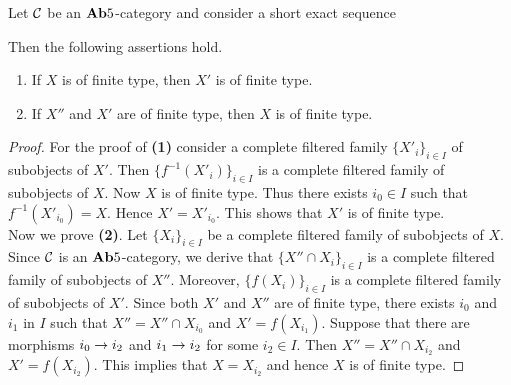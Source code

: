 \begin{proposition}\label{proposition:finitetypeandextensions}
Let ${\mathcal C}$ be an $\mathbf{Ab}5$-category and consider a short exact sequence
\begin{center}
\end{center}
Then the following assertions hold.
\begin{enumerate}[label=\emph{\textbf{(\arabic*)}}, leftmargin=1.5em]
\item If $X$ is of finite type, then $X'$ is of finite type.
\item If $X''$ and $X'$ are of finite type, then $X$ is of finite type.
\end{enumerate} 
\end{proposition}
\begin{proof}
For the proof of \textbf{(1)} consider a complete filtered family $\{X'_i\}_{i\in I}$ of subobjects of $X'$. Then $\{f^{-1}(X'_i)\}_{i\in I}$ is a complete filtered family of subobjects of $X$. Now $X$ is of finite type. Thus there exists $i_0\in I$ such that $f^{-1}(X'_{i_0})=X$. Hence $X' = X'_{i_0}$. This shows that $X'$ is of finite type.\\
Now we prove \textbf{(2)}. Let $\{X_i\}_{i\in I}$ be a complete filtered family of subobjects of $X$. Since ${\mathcal C}$ is an $\mathbf{Ab}5$-category, we derive that $\{X''\cap X_i\}_{i \in I}$ is a complete filtered family of subobjects of $X''$. Moreover, $\{f(X_i)\}_{i\in I}$ is a complete filtered family of subobjects of $X'$. Since both $X'$ and $X''$ are of finite type, there exists $i_0$ and $i_1$ in $I$ such that $X''=X''\cap X_{i_0}$ and $X' =f(X_{i_1})$. Suppose that there are morphisms $i_0\rightarrow i_2$ and $i_1\rightarrow i_2$ for some $i_2\in I$. Then $X'' = X''\cap X_{i_2}$ and $X' = f(X_{i_2})$. This implies that $X = X_{i_2}$ and hence $X$ is of finite type.
\end{proof}

